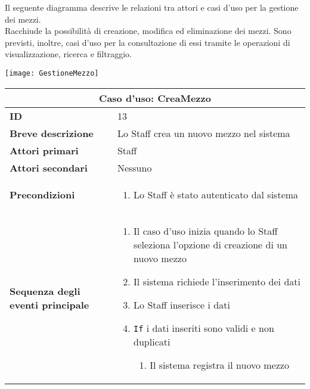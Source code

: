 \documentclass[a4paper]{report}
\begin{document}
\clearpage
{}

Il seguente diagramma descrive le relazioni tra attori e casi d’uso per la gestione dei mezzi.\\ 
Racchiude la possibilità di creazione, modifica ed eliminazione dei mezzi. Sono previsti, inoltre, casi d’uso per la consultazione di essi tramite le operazioni di visualizzazione, ricerca e filtraggio.


\begin{figure*}[ht]
    \centering
    \texttt{[image: GestioneMezzo]}
\end{figure*}

\clearpage
\begin{table}[H]
\vspace*{-0cm}
\renewcommand{\arraystretch}{1.9}
\begin{tabular}{|p{3.9cm}|p{9.9cm}|}
\hline
\multicolumn{2}{|c|}{\textbf{Caso d’uso: CreaMezzo}} \\ \hline
	\textbf{ID} & 13 \\ \hline
	\textbf{Breve descrizione} & Lo Staff crea un nuovo mezzo nel sistema \\ \hline
	\textbf{Attori primari} & Staff \\ \hline
	\textbf{Attori secondari} & Nessuno \\ \hline
	\textbf{Precondizioni} & \begin{enumerate}[label=\arabic*.,leftmargin=14pt,labelsep=0.5em,topsep=0pt,partopsep=0pt,parsep=0pt,itemsep=0pt]
        \item Lo Staff è stato autenticato dal sistema
    \end{enumerate} \\ \hline
	\textbf{Sequenza degli eventi principale} &
\begin{enumerate}[leftmargin=14pt,label=\arabic*.,labelsep=0.5em,topsep=0pt,partopsep=0pt,parsep=0pt,itemsep=0pt]
    \item Il caso d’uso inizia quando lo Staff seleziona l'opzione di creazione di un nuovo mezzo
    \item Il sistema richiede l’inserimento dei dati
    \item Lo Staff inserisce i dati
    \item \texttt{If} i dati inseriti sono validi e non duplicati
    \begin{enumerate}[label=\arabic{enumi}.\arabic*.,leftmargin=22pt,labelsep=0.5em,topsep=0pt,partopsep=0pt,parsep=0pt,itemsep=0pt]
        \item Il sistema registra il nuovo mezzo

\end{enumerate}
\end{enumerate}
\end{tabular}
\end{table}
\end{document}
